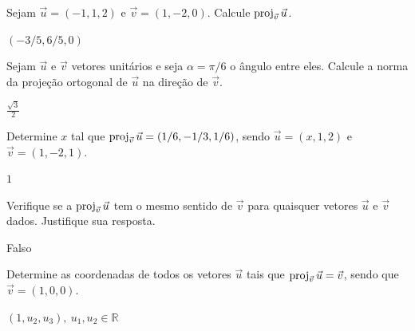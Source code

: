 \begin{exer}
  Sejam $\vec{u}=(-1,1,2)$ e $\vec{v}=(1,-2,0)$. Calcule $\operatorname{proj}_{\vec{v}}\vec{u}$.
\end{exer}
\begin{resp}
  $(-3/5, 6/5, 0)$
\end{resp}

\begin{exer}
  Sejam $\vec{u}$ e $\vec{v}$ vetores unitários e seja $\alpha = \pi/6$ o ângulo entre eles. Calcule a norma da projeção ortogonal de $\vec{u}$ na direção de $\vec{v}$.
\end{exer}
\begin{resp}
  $\frac{\sqrt{3}}{2}$
\end{resp}

\begin{exer}
  Determine $x$ tal que $\operatorname{proj}_{\vec{v}}\vec{u}=(1/6, -1/3, 1/6)$, sendo $\vec{u}=(x,1,2)$ e $\vec{v}=(1,-2,1)$.
\end{exer}
\begin{resp}
  $1$
\end{resp}

\begin{exer}
  Verifique se a $\operatorname{proj}_{\vec{v}}\vec{u}$ tem o mesmo sentido de $\vec{v}$ para quaisquer vetores $\vec{u}$ e $\vec{v}$ dados. Justifique sua resposta.
\end{exer}
\begin{resp}
  Falso
\end{resp}

\begin{exer}
  Determine as coordenadas de todos os vetores $\vec{u}$ tais que $\operatorname{proj}_{\vec{v}}\vec{u}=\vec{v}$, sendo que $\vec{v}=(1,0,0)$.
\end{exer}
\begin{resp}
  $(1,u_2,u_3),~u_1,u_2\in\mathbb{R}$
\end{resp}

